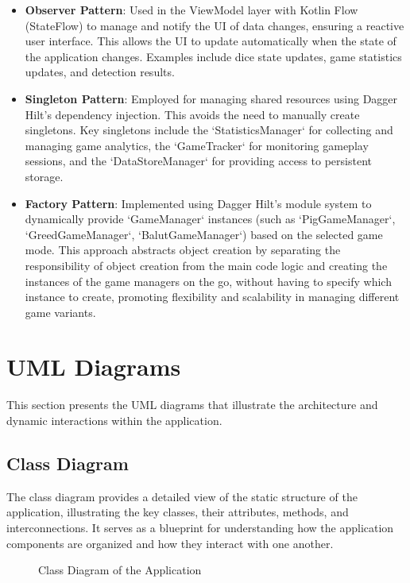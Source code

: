 \begin{itemize}
    \item \textbf{Observer Pattern}: Used in the ViewModel layer with Kotlin Flow (StateFlow) to manage and notify the UI of data changes, ensuring a reactive user interface. This allows the UI to update automatically when the state of the application changes. Examples include dice state updates, game statistics updates, and detection results.
    
    \item \textbf{Singleton Pattern}: Employed for managing shared resources using Dagger Hilt's dependency injection. This avoids the need to manually create singletons. Key singletons include the `StatisticsManager` for collecting and managing game analytics, the `GameTracker` for monitoring gameplay sessions, and the `DataStoreManager` for providing access to persistent storage.

    \item \textbf{Factory Pattern}: Implemented using Dagger Hilt's module system to dynamically provide `GameManager` instances (such as `PigGameManager`, `GreedGameManager`, `BalutGameManager`) based on the selected game mode. This approach abstracts object creation by separating the responsibility of object creation from the main code logic and creating the instances of the game managers on the go, without having to specify which instance to create, promoting flexibility and scalability in managing different game variants.
\end{itemize}

\section{UML Diagrams}
\label{sec:uml}

This section presents the UML diagrams that illustrate the architecture and dynamic interactions within the application.

\subsection{Class Diagram}
The class diagram provides a detailed view of the static structure of the application, illustrating the key classes, their attributes, methods, and interconnections. It serves as a blueprint for understanding how the application components are organized and how they interact with one another.

\begin{figure}[h]
    \centering
    
    \caption{Class Diagram of the Application}
    \label{fig:class_diagram}
\end{figure}
\vspace{-0.5cm}

